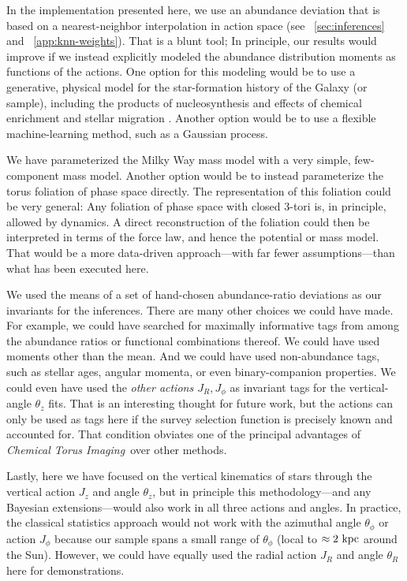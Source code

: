 \documentclass[modern]{aastex63}
\newcommand{\methodname}{\textsl{Chemical Torus Imaging}}
\begin{document}
In the implementation presented here, we use an abundance deviation that is
based on a nearest-neighbor interpolation in action space (see
\sectionname~\ref{sec:inferences} and \appendixname~\ref{app:knn-weights}).
That is a blunt tool; In principle, our results would improve if we instead
explicitly modeled the abundance distribution moments as functions of the
actions.
One option for this modeling would be to use a generative, physical model for
the star-formation history of the Galaxy (or sample), including the products of
nucleosynthesis and effects of chemical enrichment and stellar migration
\citep[similar to what is done in][]{Sanders:2015}.
Another option would be to use a flexible machine-learning method, such as a
Gaussian process.

We have parameterized the Milky Way mass model with
a very simple, few-component mass model.
Another option would be to instead parameterize the torus foliation of phase
space directly.
The representation of this foliation could be very general: Any foliation of
phase space with closed 3-tori is, in principle, allowed by dynamics.
A direct reconstruction of the foliation could then be interpreted in terms of
the force law, and hence the potential or mass model.
That would be a more data-driven approach---with far fewer assumptions---than
what has been executed here.

We used the means of
a set of hand-chosen abundance-ratio deviations
as our invariants for the inferences.
There are many other choices we could have made.
For example, we could have searched for maximally informative tags from among
the abundance ratios or functional combinations thereof. We could have used
moments other than the mean. And we could have used non-abundance tags, such
as stellar ages, angular momenta, or even binary-companion properties.
We could even have used the \emph{other actions $J_R, J_\phi$}
as invariant tags for the vertical-angle $\theta_z$ fits.
That is an interesting thought for future work, but the actions can only be used
as tags here if the survey selection function is precisely known and accounted
for. That condition obviates one of the principal advantages of
\methodname\ over other methods.

Lastly, here we have focused on the vertical kinematics of stars through the
vertical action $J_z$ and angle $\theta_z$, but in principle this
methodology---and any Bayesian extensions---would also work in all three actions
and angles.
In practice, the classical statistics approach would not work with the azimuthal
angle $\theta_\phi$ or action $J_\phi$ because our sample spans a small range of
$\theta_\phi$ (local to $\approx 2~\mathrm{kpc}$ around the Sun).
However, we could have equally used the radial action $J_R$ and angle $\theta_R$
here for demonstrations.
\end{document}
